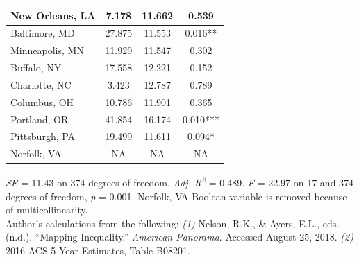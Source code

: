 \documentclass[paper=letter, fontsize=12pt]{scrartcl} %
\begin{document}
\begin{table}
\begin{center}
\begin{tabular}{|| l | c c c ||}
			\hline 
			New Orleans, LA & 7.178 & 11.662 & 0.539\\ 
			\hline 
			Baltimore, MD & 27.875 & 11.553 & 0.016**\\ 
			\hline 
			Minneapolis, MN & 11.929 & 11.547 & 0.302\\ 
			\hline 
			Buffalo, NY & 17.558 & 12.221 & 0.152\\ 
			\hline 
			Charlotte, NC & 3.423 & 12.787 & 0.789\\ 
			\hline 
			Columbus, OH & 10.786 & 11.901 & 0.365\\ 
			\hline 
			Portland, OR & 41.854 & 16.174 & 0.010***\\ 
			\hline 
			Pittsburgh, PA & 19.499 & 11.611 & 0.094*\\ 
			\hline 
			Norfolk, VA & NA & NA & NA\\ 
			\hline
		\end{tabular}
	\end{center}
	\textit{SE} = 11.43 on 374 degrees of freedom. \textit{Adj. R\textsuperscript{2}} = 0.489. \textit{F} = 22.97 on 17 and 374 degrees of freedom, \textit{p} = 0.001. Norfolk, VA Boolean variable is removed because of multicollinearity.\\
	Author's calculations from the following: \textit{(1)} Nelson, R.K., \& Ayers, E.L., eds. (n.d.). ``Mapping Inequality.'' \textit{American Panorama}. Accessed August 25, 2018. \textit{(2)} 2016 ACS 5-Year Estimates, Table B08201.
\end{table}
\end{document}
